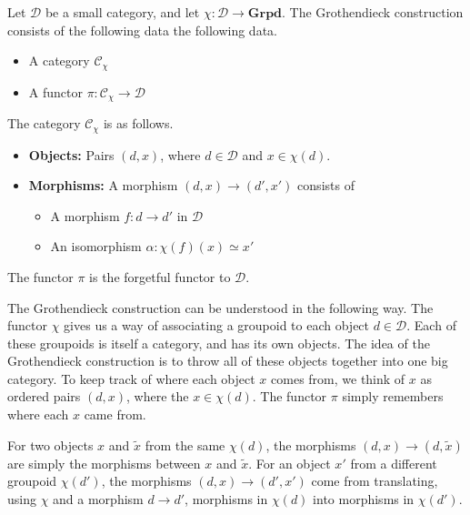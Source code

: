 \documentclass[main.tex]{subfiles}
\begin{document}
\begin{definition}
  \label{def:grothendieck_construction}
  Let $\mathcal{D}$ be a small category, and let $\chi\colon \mathcal{D} \to \mathbf{Grpd}$. The Grothendieck construction consists of the following data the following data.
  \begin{itemize}
    \item A category $\mathcal{C}_{\chi}$

    \item A functor $\pi\colon \mathcal{C}_{\chi} \to \mathcal{D}$
  \end{itemize}

  The category $\mathcal{C}_{\chi}$ is as follows.
  \begin{itemize}
    \item \textbf{Objects:} Pairs $(d, x)$, where $d \in \mathcal{D}$ and $x \in \chi(d)$.

    \item \textbf{Morphisms:} A morphism $(d, x) \to (d', x')$ consists of
      \begin{itemize}
        \item A morphism $f\colon d \to d'$ in $\mathcal{D}$

        \item An isomorphism $\alpha\colon \chi(f)(x) \simeq x'$
      \end{itemize}
  \end{itemize}

  The functor $\pi$ is the forgetful functor to $\mathcal{D}$.
\end{definition}

The Grothendieck construction can be understood in the following way. The functor $\chi$ gives us a way of associating a groupoid to each object $d \in \mathcal{D}$. Each of these groupoids is itself a category, and has its own objects. The idea of the Grothendieck construction is to throw all of these objects together into one big category. To keep track of where each object $x$ comes from, we think of $x$ as ordered pairs $(d, x)$, where the $x \in \chi(d)$. The functor $\pi$ simply remembers where each $x$ came from.

For two objects $x$ and $\tilde{x}$ from the same $\chi(d)$, the morphisms $(d, x) \to (d, \tilde{x})$ are simply the morphisms between $x$ and $\tilde{x}$. For an object $x'$ from a different groupoid $\chi(d')$, the morphisms $(d, x) \to (d', x')$ come from translating, using $\chi$ and a morphism $d \to d'$, morphisms in $\chi(d)$ into morphisms in $\chi(d')$.
\end{document}
